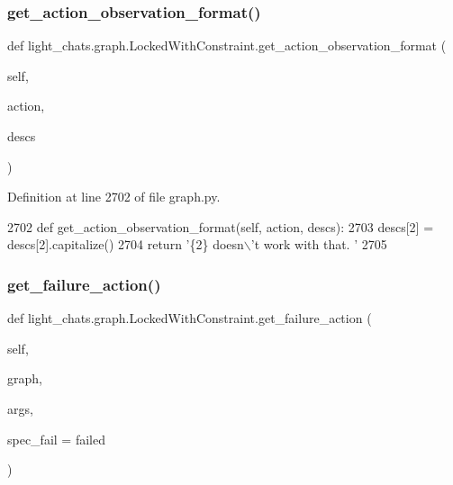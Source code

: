 \subsubsection{\texorpdfstring{get\+\_\+action\+\_\+observation\+\_\+format()}{get\_action\_observation\_format()}}
{\footnotesize\ttfamily def light\+\_\+chats.\+graph.\+Locked\+With\+Constraint.\+get\+\_\+action\+\_\+observation\+\_\+format (\begin{DoxyParamCaption}\item[{}]{self,  }\item[{}]{action,  }\item[{}]{descs }\end{DoxyParamCaption})}



Definition at line 2702 of file graph.\+py.


\begin{DoxyCode}
2702     \textcolor{keyword}{def }get\_action\_observation\_format(self, action, descs):
2703         descs[2] = descs[2].capitalize()
2704         \textcolor{keywordflow}{return} \textcolor{stringliteral}{'\{2\} doesn\(\backslash\)'t work with that. '}
2705 
\end{DoxyCode}
\mbox{\label{classlight__chats_1_1graph_1_1LockedWithConstraint_adf4e0502c0dea2fb13c19779c9f393c5}} 
\subsubsection{\texorpdfstring{get\+\_\+failure\+\_\+action()}{get\_failure\_action()}}
{\footnotesize\ttfamily def light\+\_\+chats.\+graph.\+Locked\+With\+Constraint.\+get\+\_\+failure\+\_\+action (\begin{DoxyParamCaption}\item[{}]{self,  }\item[{}]{graph,  }\item[{}]{args,  }\item[{}]{spec\+\_\+fail = {\ttfamily \textquotesingle{}failed\textquotesingle{}} }\end{DoxyParamCaption})}




